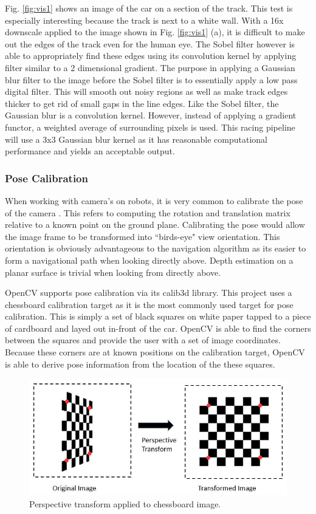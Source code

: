 \documentclass{article}
\begin{document}
Fig. \ref{fig:vis1} shows an image of the car on a section of the track. This test is especially interesting because the track is next to a white wall. With a 16x downscale applied to the image shown in Fig. \ref{fig:vis1} (a), it is difficult to make out the edges of the track even for the human eye. The Sobel filter however is able to appropriately find these edges using its convolution kernel by applying filter similar to a 2 dimensional gradient. The purpose in applying a Gaussian blur filter to the image before the Sobel filter is to essentially apply a low pass digital filter. This will smooth out noisy regions as well as make track edges thicker to get rid of small gaps in the line edges. Like the Sobel filter, the Gaussian blur is a convolution kernel. However, instead of applying a gradient functor, a weighted average of surrounding pixels is used. This racing pipeline will use a 3x3 Gaussian blur kernel as it has reasonable computational performance and yields an acceptable output.

\subsubsection{Pose Calibration}

When working with camera's on robots, it is very common to calibrate the pose of the camera \cite{b1} \cite{b3}. This refers to computing the rotation and translation matrix relative to a known point on the ground plane. Calibrating the pose would allow the image frame to be transformed into ``birds-eye" view orientation. This orientation is obviously advantageous to the navigation algorithm as its easier to form a navigational path when looking directly above. Depth estimation on a planar surface is trivial when looking from directly above.

OpenCV supports pose calibration via its calib3d library. This project uses a chessboard calibration target as it is the most commonly used target for pose calibration. This is simply a set of black squares on white paper tapped to a piece of cardboard and layed out in-front of the car. OpenCV is able to find the corners between the squares and provide the user with a set of image coordinates. Because these corners are at known positions on the calibration target, OpenCV is able to derive pose information from the location of the these squares.

\begin{figure}[htb]
	\centering
	\centerline{\includegraphics[width=1.0\linewidth]{perspective_annotated}}
	\caption{Perspective transform applied to chessboard image.}
	\label{fig:perspective}
\end{figure}
\end{document}
